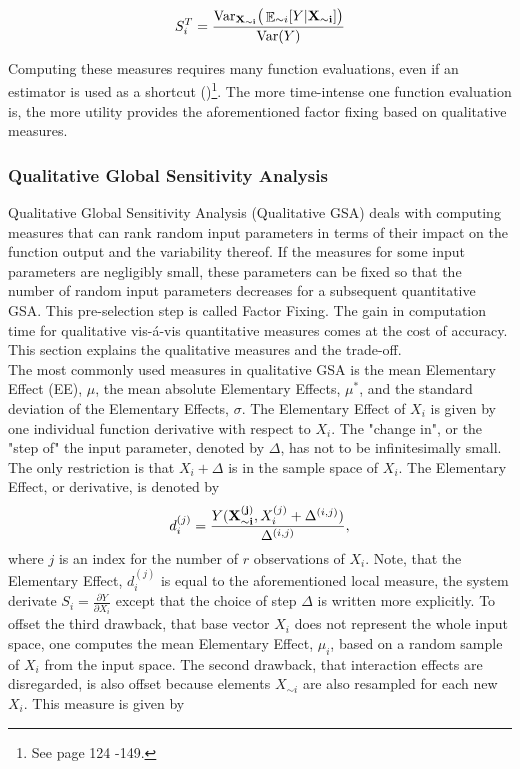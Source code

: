 \documentclass[a4paper,12pt]{article}
\DeclareMathOperator*{\E}{\mathbb{E}}
\begin{document}
\begin{align} \label{eq:tot_sobol}
S_{i}^T = \frac{\text{Var}_{\bold{X_{\sim i}}}\big( \E_{\sim i}[Y|\bold{X_{\sim i}]} \big)}{\text{Var}(Y)}
\end{align}

\noindent
Computing these measures requires many function evaluations, even if an estimator is used as a shortcut (\cite{Saltelli.2004})\footnote{See page 124 -149.}. The more time-intense one function evaluation is, the more utility provides the aforementioned factor fixing based on qualitative measures. 


\subsubsection{Qualitative Global Sensitivity Analysis}


Qualitative Global Sensitivity Analysis (Qualitative GSA) deals with computing measures that can rank random input parameters in terms of their impact on the function output and the variability thereof. If the measures for some input parameters are negligibly small, these parameters can be fixed so that the number of random input parameters decreases for a subsequent quantitative GSA. This pre-selection step is called Factor Fixing. The gain in computation time for qualitative vis-á-vis quantitative measures comes at the cost of accuracy. This section explains the qualitative measures and the trade-off. \\

\noindent
The most commonly used measures in qualitative GSA is the mean Elementary Effect (EE), $\mu$, the mean absolute Elementary Effects, $\mu^*$, and the standard deviation of the Elementary Effects, $\sigma$. The Elementary Effect of $X_i$ is given by one individual function derivative with respect to $X_i$. The "change in", or the "step of" the input parameter, denoted by $\Delta$, has not to be infinitesimally small. The only restriction is that $X_i + \Delta$ is in the sample space of $X_i$. The Elementary Effect, or derivative, is denoted by
\begin{align}
d_i^{(j)} =  \frac{Y(\bold{X_{\sim i}^{(j)}}, X_i^{(j)} + \Delta^{(i,j)})}{\Delta^{(i,j)}},
\end{align}
where $j$ is an index for the number of $r$ observations of $X_i$.
Note, that the Elementary Effect, $d_i^{(j)}$ is equal to the aforementioned local measure, the system derivate $S_i = \frac{\partial Y}{\partial X_i}$ except that the choice of step $\Delta$ is written more explicitly. To offset the third drawback, that base vector $X_i$ does not represent the whole input space, one computes the mean Elementary Effect, $\mu_i$, based on a random sample of $X_i$ from the input space. The second drawback, that interaction effects are disregarded, is also offset because elements $X_{\sim i}$ are also resampled for each new $X_i$. This measure is given by
\end{document}
